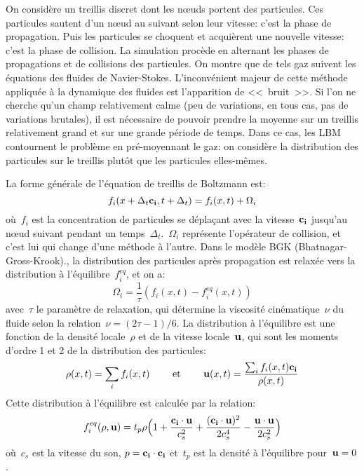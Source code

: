 On considère un treillis discret dont les nœuds portent des particules. Ces particules sautent d'un nœud au suivant selon leur vitesse: c'est la phase de propagation. Puis les particules se choquent et acquièrent une nouvelle vitesse: c'est la phase de collision. La simulation procède en alternant les phases de propagations et de collisions des particules. On montre que de tels gaz suivent les équations des fluides de Navier-Stokes. L'inconvénient majeur de cette méthode appliquée à la dynamique des fluides est l'apparition de <<~bruit~>>. Si l'on ne cherche qu'un champ relativement calme (peu de variations, en tous cas, pas de variations brutales), il est nécessaire de pouvoir prendre la moyenne sur un treillis relativement grand et sur une grande période de temps. Dans ce cas, les LBM contournent le problème en pré-moyennant le gaz: on considère la distribution des particules sur le treillis plutôt que les particules elles-mêmes.

\medskip
La forme générale de l'équation de treillis de Boltzmann est:
\begin{equation}
f_i(x+\Delta_t \mathbf{c_i}, t+\Delta_t) = f_i(x,t) + \Omega_i
\end{equation}
où~$f_i$ est la concentration de particules se déplaçant avec la vitesse~$\mathbf{c_i}$ jusqu'au nœud suivant pendant un temps~$\Delta_t$.~$\Omega_i$ représente l'opérateur de collision, et c'est lui qui change d'une méthode à l'autre. Dans le modèle BGK (Bhatnagar-Gross-Krook)., la distribution des particules après propagation est relaxée vers la distribution à l'équilibre~$f_i^{eq}$, et on a:
\begin{equation}
\Omega_i = \frac1{\tau}\left(f_i(x,t)-f_i^{eq}(x,t)\right)
\end{equation}
avec~$\tau$ le paramètre de relaxation, qui détermine la viscosité cinématique~$\nu$ du fluide selon la relation~$\nu=(2\tau -1)/6$. La distribution à l'équilibre est une fonction de la densité locale~$\rho$ et de la vitesse locale~$\mathbf{u}$, qui sont les moments d'ordre 1 et 2 de la distribution des particules:
\begin{equation}
\rho(x,t) = \displaystyle\sum_i f_i(x,t) \qquad\text{ et }\qquad \mathbf{u}(x,t)=\dfrac{\sum_i f_i(x,t)\mathbf{c_i}}{\rho(x,t)}
\end{equation}
Cette distribution à l'équilibre est calculée par la relation:
\begin{equation}
f_i^{eq}(\rho,\mathbf{u}) = t_p \rho \Bigl(1+\dfrac{\mathbf{c_i}\cdot\mathbf{u}}{c_s^2} + \dfrac{(\mathbf{c_i}\cdot\mathbf{u})^2}{2c_s^4} - \dfrac{\mathbf{u}\cdot\mathbf{u}}{2c_s^2}\Bigr)
\end{equation}
où~$c_s$ est la vitesse du son, $p=\mathbf{c_i}\cdot\mathbf{c_i}$ et~$t_p$ est la densité à l'équilibre pour~$\mathbf{u}=0$.






